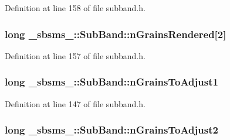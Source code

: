 Definition at line 158 of file subband.\+h.

\subsubsection[{\texorpdfstring{n\+Grains\+Rendered}{nGrainsRendered}}]{\setlength{\rightskip}{0pt plus 5cm}long \+\_\+sbsms\+\_\+\+::\+Sub\+Band\+::n\+Grains\+Rendered\mbox{[}2\mbox{]}\hspace{0.3cm}{\ttfamily [protected]}}\hypertarget{class__sbsms___1_1_sub_band_a885e4cd7a56cf1daccb4e88343ff236e}{}\label{class__sbsms___1_1_sub_band_a885e4cd7a56cf1daccb4e88343ff236e}


Definition at line 157 of file subband.\+h.

\subsubsection[{\texorpdfstring{n\+Grains\+To\+Adjust1}{nGrainsToAdjust1}}]{\setlength{\rightskip}{0pt plus 5cm}long \+\_\+sbsms\+\_\+\+::\+Sub\+Band\+::n\+Grains\+To\+Adjust1\hspace{0.3cm}{\ttfamily [protected]}}\hypertarget{class__sbsms___1_1_sub_band_ad71699f8a2251876939ccf818699aa28}{}\label{class__sbsms___1_1_sub_band_ad71699f8a2251876939ccf818699aa28}


Definition at line 147 of file subband.\+h.

\subsubsection[{\texorpdfstring{n\+Grains\+To\+Adjust2}{nGrainsToAdjust2}}]{\setlength{\rightskip}{0pt plus 5cm}long \+\_\+sbsms\+\_\+\+::\+Sub\+Band\+::n\+Grains\+To\+Adjust2\hspace{0.3cm}{\ttfamily [protected]}}\hypertarget{class__sbsms___1_1_sub_band_a3a46c5af5bfa462de5f43d1a692d95ce}{}\label{class__sbsms___1_1_sub_band_a3a46c5af5bfa462de5f43d1a692d95ce}


